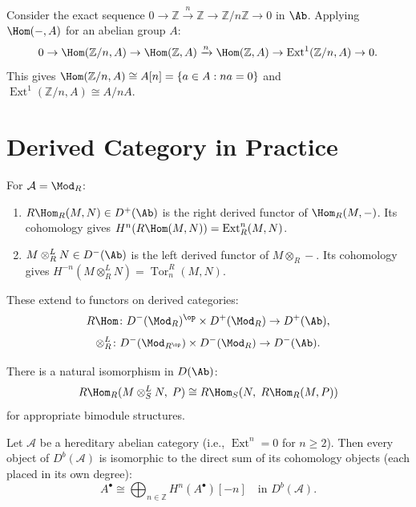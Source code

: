 \begin{example}\label{ex:les-application}
Consider the exact sequence $0 \to \mathbb{Z} \xrightarrow{n} \mathbb{Z} \to \mathbb{Z}/n\mathbb{Z} \to 0$
in $\Ab$. Applying $\Hom(-, A)$ for an abelian group $A$:
\[
    0 \to \Hom(\mathbb{Z}/n, A) \to \Hom(\mathbb{Z}, A) \xrightarrow{n}
    \Hom(\mathbb{Z}, A) \to \operatorname{Ext}^1(\mathbb{Z}/n, A) \to 0.
\]
This gives $\Hom(\mathbb{Z}/n, A) \cong A[n] = \{a \in A : na = 0\}$ and
$\operatorname{Ext}^1(\mathbb{Z}/n, A) \cong A/nA$.
\end{example}


\section{Derived Category in Practice}\label{sec:derived-practice}

\begin{definition}\label{def:rhom-ltensor}
For $\mathcal{A} = \Mod_R$:
\begin{enumerate}
    \item $R\Hom_R(M, N) \in D^+(\Ab)$ is the right derived functor of $\Hom_R(M, -)$.
    Its cohomology gives $H^n(R\Hom(M, N)) = \operatorname{Ext}^n_R(M, N)$.
    \item $M \otimes_R^L N \in D^-(\Ab)$ is the left derived functor of $M \otimes_R -$.
    Its cohomology gives $H^{-n}(M \otimes_R^L N) = \operatorname{Tor}_n^R(M, N)$.
\end{enumerate}
These extend to functors on derived categories:
\[
    R\Hom \colon D^-(\Mod_R)^{\op} \times D^+(\Mod_R) \to D^+(\Ab),
\]
\[
    \otimes_R^L \colon D^-(\Mod_{R^{\op}}) \times D^-(\Mod_R) \to D^-(\Ab).
\]
\end{definition}

\begin{proposition}\label{prop:derived-adjunction}
There is a natural isomorphism in $D(\Ab)$:
\[
    R\Hom_R(M \otimes_S^L N, \; P) \cong R\Hom_S(N, \; R\Hom_R(M, P))
\]
for appropriate bimodule structures.
\end{proposition}

\begin{proposition}\label{prop:hereditary-derived}
Let $\mathcal{A}$ be a hereditary abelian category (i.e., $\operatorname{Ext}^n = 0$ for $n \geq 2$).
Then every object of $D^b(\mathcal{A})$ is isomorphic to the direct sum of its cohomology
objects (each placed in its own degree):
\[
    A^\bullet \cong \bigoplus_{n \in \mathbb{Z}} H^n(A^\bullet)[-n] \quad \text{in } D^b(\mathcal{A}).
\]
\end{proposition}

